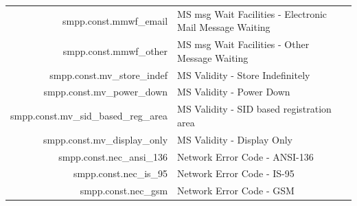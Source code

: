 \documentclass[a4paper,latin]{paper}
\begin{document}
\begin{tabularx}{\linewidth}{ | >{\ttfamily} r | >{\ttfamily} X |}
	smpp.const.mmwf\_email				& MS msg Wait Facilities - Electronic Mail Message Waiting\\
	smpp.const.mmwf\_other				& MS msg Wait Facilities - Other Message Waiting\\
	smpp.const.mv\_store\_indef			& MS Validity - Store Indefinitely\\
	smpp.const.mv\_power\_down			& MS Validity - Power Down\\
	smpp.const.mv\_sid\_based\_reg\_area		& MS Validity - SID based registration area\\
	smpp.const.mv\_display\_only			& MS Validity - Display Only\\
	smpp.const.nec\_ansi\_136			& Network Error Code - ANSI-136\\
	smpp.const.nec\_is\_95				& Network Error Code - IS-95\\
	smpp.const.nec\_gsm				& Network Error Code - GSM\\
	\hline
\end{tabularx}%
\clearpage
\end{document}
